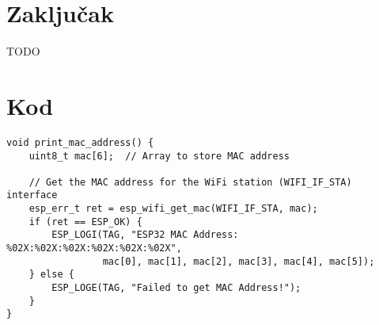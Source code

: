 \documentclass[seminarskirad]{fer}
\begin{document}
\chapter{Zaključak}
\label{pog:zakljucak}

TODO







\backmatter

\chapter{Kod}

\begin{lstlisting}[caption=Dohvacanje MAC adrese] 
void print_mac_address() {
    uint8_t mac[6];  // Array to store MAC address

    // Get the MAC address for the WiFi station (WIFI_IF_STA) interface
    esp_err_t ret = esp_wifi_get_mac(WIFI_IF_STA, mac);
    if (ret == ESP_OK) {
        ESP_LOGI(TAG, "ESP32 MAC Address: %02X:%02X:%02X:%02X:%02X:%02X",
                 mac[0], mac[1], mac[2], mac[3], mac[4], mac[5]);
    } else {
        ESP_LOGE(TAG, "Failed to get MAC Address!");
    }
}
\end{lstlisting}

\newpage
\end{document}
